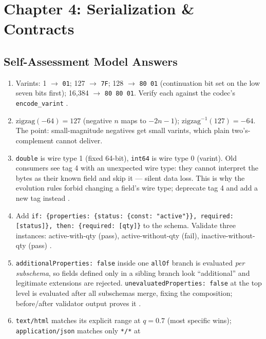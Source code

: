 \section{Chapter 4: Serialization \& Contracts}
\label{sec:sol-ch4}

\subsection{Self-Assessment Model Answers}

\begin{enumerate}[label=\textbf{E4.\arabic*}, leftmargin=2.2em]
  \item Varints: 1 $\to$ \texttt{01}; 127 $\to$ \texttt{7F}; 128 $\to$
    \texttt{80 01} (continuation bit set on the low seven bits first);
    16{,}384 $\to$ \texttt{80 80 01}. Verify each against the codec's
    \texttt{encode\_varint} \cite{protobufdocs}.
  \item $\mathrm{zigzag}(-64) = 127$ (negative $n$ maps to $-2n-1$);
    $\mathrm{zigzag}^{-1}(127) = -64$. The point: small-magnitude negatives
    get small varints, which plain two's-complement cannot deliver.
  \item \texttt{double} is wire type 1 (fixed 64-bit), \texttt{int64} is
    wire type 0 (varint). Old consumers see tag 4 with an unexpected wire
    type: they cannot interpret the bytes as their known field and skip it
    --- silent data loss. This is why the evolution rules forbid changing a
    field's wire type; deprecate tag 4 and add a new tag instead
    \cite{protobufdocs}.
  \item Add \texttt{if: \{properties: \{status: \{const: "active"\}\},
    required: [status]\}, then: \{required: [qty]\}} to the schema. Validate
    three instances: active-with-qty (pass), active-without-qty (fail),
    inactive-without-qty (pass) \cite{jsonschemadocs}.
  \item \texttt{additionalProperties: false} inside one \texttt{allOf}
    branch is evaluated \emph{per subschema}, so fields defined only in a
    sibling branch look ``additional'' and legitimate extensions are
    rejected. \texttt{unevaluatedProperties: false} at the top level is
    evaluated after all subschemas merge, fixing the composition;
    before/after validator output proves it \cite{jsonschemadocs}.
  \item \texttt{text/html} matches its explicit range at $q=0.7$ (most
    specific wins); \texttt{application/json} matches only \texttt{*/*} at

\end{enumerate}
